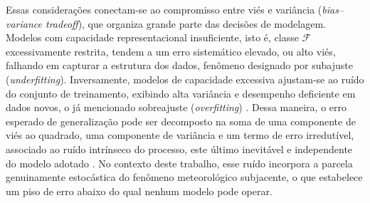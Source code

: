 Essas considerações conectam-se ao compromisso entre viés e variância
(\textit{bias--variance tradeoff}), que organiza grande parte das decisões de
modelagem. Modelos com capacidade representacional insuficiente, isto é, classe
$\mathcal{F}$ excessivamente restrita, tendem a um erro sistemático elevado,
ou alto viés, falhando em capturar a estrutura dos dados, fenômeno designado por
subajuste (\textit{underfitting}). Inversamente, modelos de capacidade excessiva
ajustam-se ao ruído do conjunto de treinamento, exibindo alta
variância e desempenho deficiente em dados novos, o já mencionado sobreajuste
(\textit{overfitting}) \cite{hastie2009}. Dessa maneira, o erro esperado de generalização pode
ser decomposto na soma de uma componente de viés ao quadrado, uma componente de
variância e um termo de erro irredutível, associado ao ruído intrínseco do
processo, este último inevitável e independente do modelo adotado
\cite{geman1992}. No contexto deste trabalho, esse ruído incorpora a parcela
genuinamente estocástica do fenômeno meteorológico subjacente, o que estabelece
um piso de erro abaixo do qual nenhum modelo pode operar.

